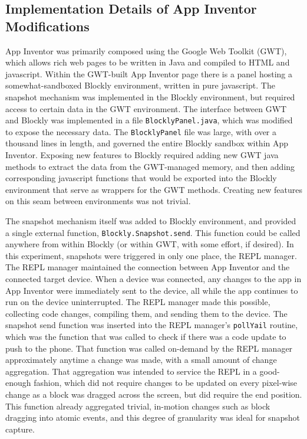 \subsection{Implementation Details of App Inventor Modifications}
\label{sub:tech:ai}
App Inventor was primarily composed using the Google Web Toolkit (GWT), which allows rich web pages to be written in Java and compiled to HTML and javascript. Within the GWT-built App Inventor page there is a panel hosting a somewhat-sandboxed Blockly environment, written in pure javascript. The snapshot mechanism was implemented in the Blockly environment, but required access to certain data in the GWT environment. The interface between GWT and Blockly was implemented in a file \texttt{BlocklyPanel.java}, which was modified to expose the necessary data. The \texttt{BlocklyPanel} file was large, with over a thousand lines in length, and governed the entire Blockly sandbox within App Inventor. Exposing new features to Blockly required adding new GWT java methods to extract the data from the GWT-managed memory, and then adding corresponding javascript functions that would be exported into the Blockly environment that serve as wrappers for the GWT methods. Creating new features on this seam between environments was not trivial. %

The snapshot mechanism itself was added to Blockly environment, and provided a single external function, \texttt{Blockly.Snapshot.send}. This function could be called anywhere from within Blockly (or within GWT, with some effort, if desired). In this experiment, snapshots were triggered in only one place, the REPL manager. The REPL manager maintained the connection between App Inventor and the connected target device. When a device was connected, any changes to the app in App Inventor were immediately sent to the device, all while the app continues to run on the device uninterrupted. The REPL manager made this possible, collecting code changes, compiling them, and sending them to the device. The snapshot send function was inserted into the REPL manager's \texttt{pollYail} routine, which was the function that was called to check if there was a code update to push to the phone. That function was called on-demand by the REPL manager approximately anytime a change was made, with a small amount of change aggregation. That aggregation was intended to service the REPL in a good-enough fashion, which did not require changes to be updated on every pixel-wise change as a block was dragged across the screen, but did require the end position. This function already aggregated trivial, in-motion changes such as block dragging into atomic events, and this degree of granularity was ideal for snapshot capture. 

